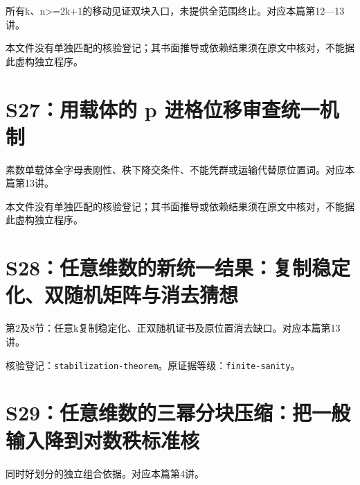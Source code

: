 所有k、n>=2k+1的移动见证双块入口，未提供全范围终止。对应本篇第12—13讲。

\par{}\par

本文件没有单独匹配的核验登记；其书面推导或依赖结果须在原文中核对，不能据此虚构独立程序。

\section{S27：用载体的 p 进格位移审查统一机制}\label{source:S27}

素数单载体全字母表刚性、秩下降交条件、不能凭群或运输代替原位置词。对应本篇第13讲。

\par{}\par

本文件没有单独匹配的核验登记；其书面推导或依赖结果须在原文中核对，不能据此虚构独立程序。

\section{S28：任意维数的新统一结果：复制稳定化、双随机矩阵与消去猜想}\label{source:S28}

第2及8节：任意k复制稳定化、正双随机证书及原位置消去缺口。对应本篇第13讲。

\par{}\par

核验登记：{\small\nolinkurl{stabilization-theorem}}。原证据等级：{\small\nolinkurl{finite-sanity}}。

\section{S29：任意维数的三幂分块压缩：把一般输入降到对数秩标准核}\label{source:S29}

同时好划分的独立组合依据。对应本篇第4讲。

\par{}\par

